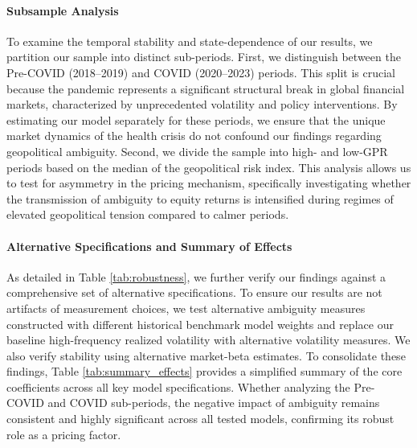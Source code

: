 \documentclass[preprint,12pt,authoryear]{elsarticle}
\begin{document}
\paragraph{Subsample Analysis} To examine the temporal stability and state-dependence of our results, we partition our sample into distinct sub-periods. First, we distinguish between the Pre-COVID (2018--2019) and COVID (2020--2023) periods. This split is crucial because the pandemic represents a significant structural break in global financial markets, characterized by unprecedented volatility and policy interventions. By estimating our model separately for these periods, we ensure that the unique market dynamics of the health crisis do not confound our findings regarding geopolitical ambiguity. Second, we divide the sample into high- and low-GPR periods based on the median of the geopolitical risk index. This analysis allows us to test for asymmetry in the pricing mechanism, specifically investigating whether the transmission of ambiguity to equity returns is intensified during regimes of elevated geopolitical tension compared to calmer periods.

\paragraph{Alternative Specifications and Summary of Effects} As detailed in Table \ref{tab:robustness}, we further verify our findings against a comprehensive set of alternative specifications. To ensure our results are not artifacts of measurement choices, we test alternative ambiguity measures constructed with different historical benchmark model weights and replace our baseline high-frequency realized volatility with alternative volatility measures. We also verify stability using alternative market-beta estimates. To consolidate these findings, Table \ref{tab:summary_effects} provides a simplified summary of the core coefficients across all key model specifications. Whether analyzing the Pre-COVID and COVID sub-periods, the negative impact of ambiguity remains consistent and highly significant across all tested models, confirming its robust role as a pricing factor.
\end{document}
